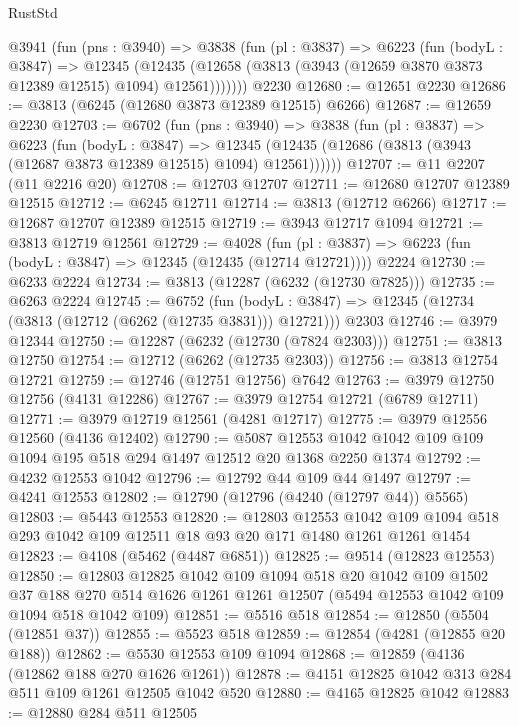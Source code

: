 \begin{lexlean}{RustStd}
\begin{coremodule}
    @3941
      (fun (pns : @3940) =>
      @3838
        (fun (pl : @3837) =>
        @6223
          (fun (bodyL : @3847) =>
          @12345
            (@12435 (@12658 (@3813 (@3943 (@12659 @3870 @3873 @12389 @12515) @1094) @12561)))))))
    @2230
@12680 := @12651 @2230
@12686 := @3813 (@6245 (@12680 @3873 @12389 @12515) @6266)
@12687 := @12659 @2230
@12703 := @6702
    (fun (pns : @3940) =>
    @3838
      (fun (pl : @3837) =>
      @6223
        (fun (bodyL : @3847) =>
        @12345 (@12435 (@12686 (@3813 (@3943 (@12687 @3873 @12389 @12515) @1094) @12561))))))
@12707 := @11 @2207 (@11 @2216 @20)
@12708 := @12703 @12707
@12711 := @12680 @12707 @12389 @12515
@12712 := @6245 @12711
@12714 := @3813 (@12712 @6266)
@12717 := @12687 @12707 @12389 @12515
@12719 := @3943 @12717 @1094
@12721 := @3813 @12719 @12561
@12729 := @4028
    (fun (pl : @3837) => @6223 (fun (bodyL : @3847) => @12345 (@12435 (@12714 @12721))))
    @2224
@12730 := @6233 @2224
@12734 := @3813 (@12287 (@6232 (@12730 @7825)))
@12735 := @6263 @2224
@12745 := @6752
    (fun (bodyL : @3847) => @12345 (@12734 (@3813 (@12712 (@6262 (@12735 @3831))) @12721)))
    @2303
@12746 := @3979 @12344
@12750 := @12287 (@6232 (@12730 (@7824 @2303)))
@12751 := @3813 @12750
@12754 := @12712 (@6262 (@12735 @2303))
@12756 := @3813 @12754 @12721
@12759 := @12746 (@12751 @12756) @7642
@12763 := @3979 @12750 @12756 (@4131 @12286)
@12767 := @3979 @12754 @12721 (@6789 @12711)
@12771 := @3979 @12719 @12561 (@4281 @12717)
@12775 := @3979 @12556 @12560 (@4136 @12402)
@12790 := @5087 @12553 @1042 @1042 @109 @109 @1094 @195 @518 @294 @1497 @12512 @20 @1368 @2250 @1374
@12792 := @4232 @12553 @1042
@12796 := @12792 @44 @109 @44 @1497
@12797 := @4241 @12553
@12802 := @12790 (@12796 (@4240 (@12797 @44)) @5565)
@12803 := @5443 @12553
@12820 := @12803
    @12553
    @1042
    @109
    @1094
    @518
    @293
    @1042
    @109
    @12511
    @18
    @93
    @20
    @171
    @1480
    @1261
    @1261
    @1454
@12823 := @4108 (@5462 (@4487 @6851))
@12825 := @9514 (@12823 @12553)
@12850 := @12803
    @12825
    @1042
    @109
    @1094
    @518
    @20
    @1042
    @109
    @1502
    @37
    @188
    @270
    @514
    @1626
    @1261
    @1261
    @12507
    (@5494 @12553 @1042 @109 @1094 @518 @1042 @109)
@12851 := @5516 @518
@12854 := @12850 (@5504 (@12851 @37))
@12855 := @5523 @518
@12859 := @12854 (@4281 (@12855 @20 @188))
@12862 := @5530 @12553 @109 @1094
@12868 := @12859 (@4136 (@12862 @188 @270 @1626 @1261))
@12878 := @4151 @12825 @1042 @313 @284 @511 @109 @1261 @12505 @1042 @520
@12880 := @4165 @12825 @1042
@12883 := @12880 @284 @511 @12505

\end{coremodule}
\end{lexlean}
